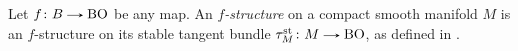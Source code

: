\begin{definition}
  \label{mfd-f-struc}
  Let $f \c B \to \B\O$ be any map. An \emph{$f$-structure} on a
  compact smooth manifold $M$ is an $f$-structure on its stable
  tangent bundle $\tau^\st_M \c M \to \B\O$, as defined in
  .
\end{definition}






